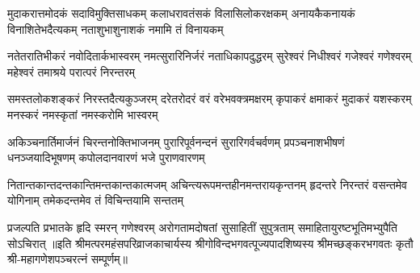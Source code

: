 
\fourlineindentedshloka
{मुदाकरात्तमोदकं सदाविमुक्तिसाधकम्}
{कलाधरावतंसकं विलासिलोकरक्षकम्}
{अनायकैकनायकं विनाशितेभदैत्यकम्}
{नताशुभाशुनाशकं नमामि तं विनायकम्}

\fourlineindentedshloka
{नतेतरातिभीकरं नवोदितार्कभास्वरम्}
{नमत्सुरारिनिर्जरं नताधिकापदुद्धरम्}
{सुरेश्वरं निधीश्वरं गजेश्वरं गणेश्वरम्}
{महेश्वरं तमाश्रये परात्परं निरन्तरम्}

\fourlineindentedshloka
{समस्तलोकशङ्करं निरस्तदैत्यकुञ्जरम्}
{दरेतरोदरं वरं वरेभवक्त्रमक्षरम्}
{कृपाकरं क्षमाकरं मुदाकरं यशस्करम्}
{मनस्करं नमस्कृतां नमस्करोमि भास्वरम्}

\fourlineindentedshloka
{अकिञ्चनार्तिमार्जनं चिरन्तनोक्तिभाजनम्}
{पुरारिपूर्वनन्दनं सुरारिगर्वचर्वणम्}
{प्रपञ्चनाशभीषणं धनञ्जयादिभूषणम्}
{कपोलदानवारणं भजे पुराणवारणम्}

\fourlineindentedshloka
{नितान्तकान्तदन्तकान्तिमन्तकान्तकात्मजम्}
{अचिन्त्यरूपमन्तहीनमन्तरायकृन्तनम्}
{हृदन्तरे निरन्तरं वसन्तमेव योगिनाम्}
{तमेकदन्तमेव तं विचिन्तयामि सन्ततम्}

{प्रजल्पति प्रभातके हृदि स्मरन् गणेश्वरम्}
{अरोगतामदोषतां सुसाहितीं सुपुत्रताम्}
{समाहितायुरष्टभूतिमभ्युपैति सोऽचिरात्}
॥इति श्रीमत्परमहंसपरिव्राजकाचार्यस्य श्रीगोविन्दभगवत्पूज्यपादशिष्यस्य 
श्रीमच्छङ्करभगवतः कृतौ श्री-महागणेशपञ्चरत्नं सम्पूर्णम्॥
